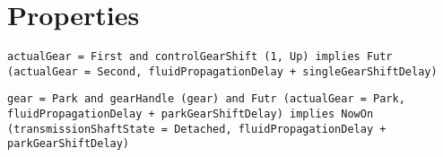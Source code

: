 \section{Properties}
\label{Section:Properties}

\begin{lstlisting}[language=TRIO,basicstyle=\small,breaklines,breakatwhitespace,frame=single,caption=Property 1,label=Code:Property1]
actualGear = First and controlGearShift (1, Up) implies Futr (actualGear = Second, fluidPropagationDelay + singleGearShiftDelay)
\end{lstlisting}

\begin{lstlisting}[language=TRIO,basicstyle=\small,breaklines,breakatwhitespace,frame=single,caption=Property 2,label=Code:Property2]
gear = Park and gearHandle (gear) and Futr (actualGear = Park, fluidPropagationDelay + parkGearShiftDelay) implies NowOn (transmissionShaftState = Detached, fluidPropagationDelay + parkGearShiftDelay)
\end{lstlisting}
